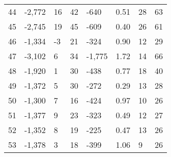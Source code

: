 \begin{appendices}
\begin{longtable}[c]{@{}llllllll@{}}
	44                       & -2,772                        & 16                           & 42                           & -640                     & 0.51                    & 28                   & 63                      \\
	45                       & -2,745                        & 19                           & 45                           & -609                     & 0.40                    & 26                   & 61                      \\
	46                       & -1,334                        & -3                           & 21                           & -324                     & 0.90                    & 12                   & 29                      \\
	47                       & -3,102                        & 6                            & 34                           & -1,775                   & 1.72                    & 14                   & 66                      \\
	48                       & -1,920                        & 1                            & 30                           & -438                     & 0.77                    & 18                   & 40                      \\
	49                       & -1,372                        & 5                            & 30                           & -272                     & 0.29                    & 13                   & 28                      \\
	50                       & -1,300                        & 7                            & 16                           & -424                     & 0.97                    & 10                   & 26                      \\
	51                       & -1,377                        & 9                            & 23                           & -323                     & 0.49                    & 12                   & 27                      \\
	52                       & -1,352                        & 8                            & 19                           & -225                     & 0.47                    & 13                   & 26                      \\
	53                       & -1,378                        & 3                            & 18                           & -399                     & 1.06                    & 9                    & 26                      \\

\end{longtable}
\end{appendices}
